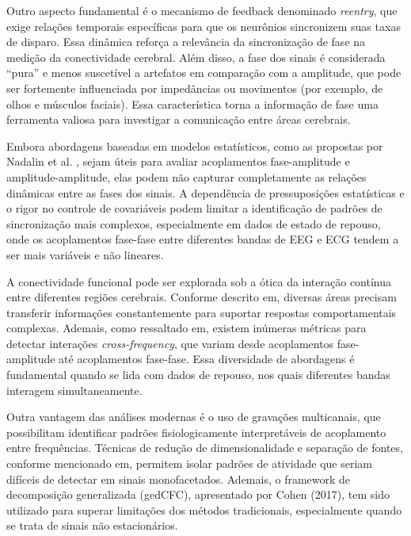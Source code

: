 Outro aspecto fundamental é o mecanismo de feedback denominado \emph{reentry}, que exige relações temporais específicas para que os neurônios sincronizem suas taxas de disparo\textsuperscript{\cite{seraj2018cerebral}}. Essa dinâmica reforça a relevância da sincronização de fase na medição da conectividade cerebral. Além disso, a fase dos sinais é considerada “pura” e menos suscetível a artefatos em comparação com a amplitude, que pode ser fortemente influenciada por impedâncias ou movimentos (por exemplo, de olhos e músculos faciais)\textsuperscript{\cite{seraj2018cerebral}}. Essa característica torna a informação de fase uma ferramenta valiosa para investigar a comunicação entre áreas cerebrais.

Embora abordagens baseadas em modelos estatísticos, como as propostas por Nadalin et al. \cite{nadalin2019statistical}, sejam úteis para avaliar acoplamentos fase-amplitude e amplitude-amplitude, elas podem não capturar completamente as relações dinâmicas entre as fases dos sinais. A dependência de pressuposições estatísticas e o rigor no controle de covariáveis podem limitar a identificação de padrões de sincronização mais complexos, especialmente em dados de estado de repouso, onde os acoplamentos fase-fase entre diferentes bandas de EEG e ECG tendem a ser mais variáveis e não lineares.

A conectividade funcional pode ser explorada sob a ótica da interação contínua entre diferentes regiões cerebrais. Conforme descrito em\textsuperscript{\cite{sorrentino2022detection}}, diversas áreas precisam transferir informações constantemente para suportar respostas comportamentais complexas. Ademais, como ressaltado em\textsuperscript{\cite{sorrentino2022detection}}, existem inúmeras métricas para detectar interações \textit{cross-frequency}, que variam desde acoplamentos fase-amplitude até acoplamentos fase-fase. Essa diversidade de abordagens é fundamental quando se lida com dados de repouso, nos quais diferentes bandas interagem simultaneamente.

Outra vantagem das análises modernas é o uso de gravações multicanais, que possibilitam identificar padrões fisiologicamente interpretáveis de acoplamento entre frequências. Técnicas de redução de dimensionalidade e separação de fontes, conforme mencionado em\textsuperscript{\cite{cohen2017multivariate}}, permitem isolar padrões de atividade que seriam difíceis de detectar em sinais monofacetados. Ademais, o framework de decomposição generalizada (gedCFC), apresentado por Cohen (2017)\textsuperscript{\cite{cohen2017multivariate}}, tem sido utilizado para superar limitações dos métodos tradicionais, especialmente quando se trata de sinais não estacionários.

